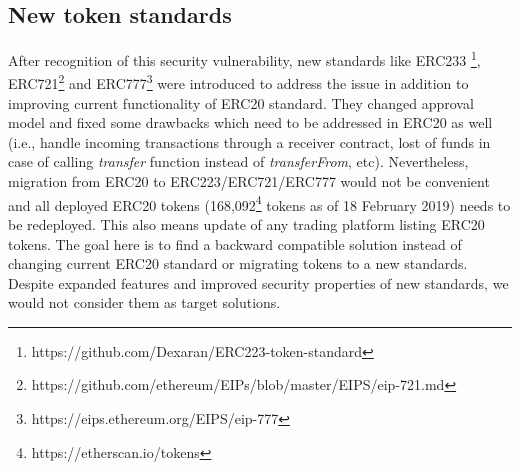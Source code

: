 \subsection{New token standards}
After recognition of this security vulnerability, new standards like ERC233 \footnote{https://github.com/Dexaran/ERC223-token-standard}, ERC721\footnote{https://github.com/ethereum/EIPs/blob/master/EIPS/eip-721.md} and ERC777\footnote{https://eips.ethereum.org/EIPS/eip-777} were introduced to address the issue in addition to improving current functionality of ERC20 standard. They changed approval model and fixed some drawbacks which need to be addressed in ERC20 as well (i.e., handle incoming transactions through a receiver contract, lost of funds in case of calling \textit{transfer} function instead of \textit{transferFrom}, etc). Nevertheless, migration from ERC20 to ERC223/ERC721/ERC777 would not be convenient and all deployed ERC20 tokens (168,092\footnote{https://etherscan.io/tokens} tokens as of 18 February 2019) needs to be redeployed. This also means update of any trading platform listing ERC20 tokens. The goal here is to find a backward compatible solution instead of changing current ERC20 standard or migrating tokens to a new standards. Despite expanded features and improved security properties of new standards, we would not consider them as target solutions.